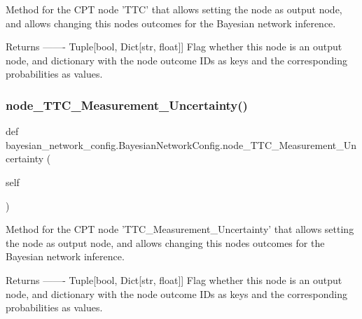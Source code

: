\begin{DoxyVerb}Method for the CPT node 'TTC' that allows setting the node as output node,
and allows changing this nodes outcomes for the Bayesian network inference.

Returns
-------
Tuple[bool, Dict[str, float]]
    Flag whether this node is an output node, and dictionary with the node outcome IDs as keys
    and the corresponding probabilities as values.
\end{DoxyVerb}
 \mbox{\label{classbayesian__network__config_1_1_bayesian_network_config_a813f87173ae162e2463b86d2fbf7f287}} 
\subsubsection{\texorpdfstring{node\+\_\+\+T\+T\+C\+\_\+\+Measurement\+\_\+\+Uncertainty()}{node\_TTC\_Measurement\_Uncertainty()}}
{\footnotesize\ttfamily def bayesian\+\_\+network\+\_\+config.\+Bayesian\+Network\+Config.\+node\+\_\+\+T\+T\+C\+\_\+\+Measurement\+\_\+\+Uncertainty (\begin{DoxyParamCaption}\item[{}]{self }\end{DoxyParamCaption})}

\begin{DoxyVerb}Method for the CPT node 'TTC_Measurement_Uncertainty' that allows setting the node as output node,
and allows changing this nodes outcomes for the Bayesian network inference.

Returns
-------
Tuple[bool, Dict[str, float]]
    Flag whether this node is an output node, and dictionary with the node outcome IDs as keys
    and the corresponding probabilities as values.
\end{DoxyVerb}
 \mbox{\label{classbayesian__network__config_1_1_bayesian_network_config_ac9fee7655297b9617622e9c4d4669a23}} 
